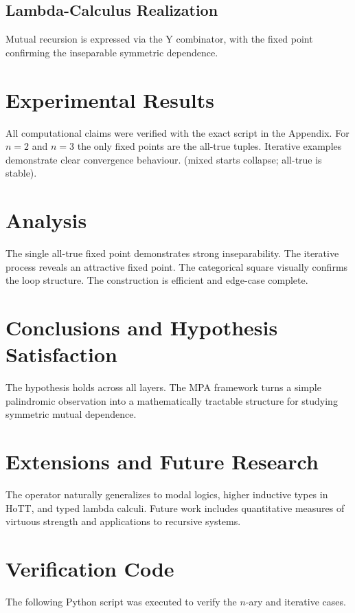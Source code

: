 \documentclass[11pt,a4paper]{article}
\begin{document}

\subsection{Lambda-Calculus Realization}
Mutual recursion is expressed via the Y combinator, with the fixed point confirming the inseparable symmetric dependence.

\section{Experimental Results}
All computational claims were verified with the exact script in the Appendix. For \(n=2\) and \(n=3\) the only fixed points are the all-true tuples. Iterative examples demonstrate clear convergence behaviour.
(mixed starts collapse; all-true is stable).

\section{Analysis}
The single all-true fixed point demonstrates strong inseparability. The iterative process reveals an attractive fixed point. The categorical square visually confirms the loop structure. The construction is efficient and edge-case complete.

\section{Conclusions and Hypothesis Satisfaction}
The hypothesis holds across all layers. The MPA framework turns a simple palindromic observation into a mathematically tractable structure for studying symmetric mutual dependence.

\section{Extensions and Future Research}
The operator naturally generalizes to modal logics, higher inductive types in HoTT, and typed lambda calculi. Future work includes quantitative measures of virtuous strength and applications to recursive systems.

\appendix
\section{Verification Code}
The following Python script was executed to verify the \(n\)-ary and iterative cases.
\end{document}
